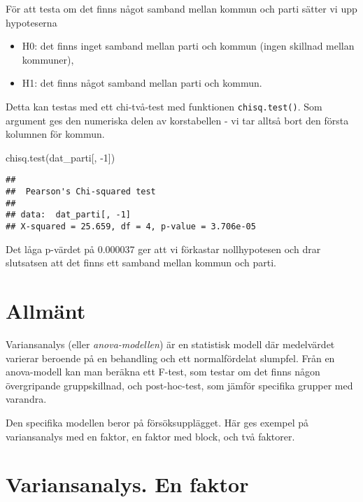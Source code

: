 \documentclass[
]{book}
\newenvironment{Shaded}{\begin{snugshade}}{\end{snugshade}}
\newcommand{\DecValTok}[1]{\textcolor[rgb]{0.00,0.00,0.81}{#1}}
\newcommand{\FunctionTok}[1]{\textcolor[rgb]{0.00,0.00,0.00}{#1}}
\newcommand{\NormalTok}[1]{#1}
\newcommand{\SpecialCharTok}[1]{\textcolor[rgb]{0.00,0.00,0.00}{#1}}
\providecommand{\tightlist}{%
  \setlength{\itemsep}{0pt}\setlength{\parskip}{0pt}}
\theoremstyle{definition}
\theoremstyle{definition}
\theoremstyle{definition}
\theoremstyle{definition}
\theoremstyle{remark}
\begin{document}
För att testa om det finns något samband mellan kommun och parti sätter vi upp hypoteserna

\begin{itemize}
\tightlist
\item
  H0: det finns inget samband mellan parti och kommun (ingen skillnad mellan kommuner),
\item
  H1: det finns något samband mellan parti och kommun.
\end{itemize}

Detta kan testas med ett chi-två-test med funktionen \texttt{chisq.test()}. Som argument ges den numeriska delen av korstabellen - vi tar alltså bort den första kolumnen för kommun.

\begin{Shaded}
\begin{Highlighting}[]
\FunctionTok{chisq.test}\NormalTok{(dat\_parti[, }\SpecialCharTok{{-}}\DecValTok{1}\NormalTok{])}
\end{Highlighting}
\end{Shaded}

\begin{verbatim}
## 
##  Pearson's Chi-squared test
## 
## data:  dat_parti[, -1]
## X-squared = 25.659, df = 4, p-value = 3.706e-05
\end{verbatim}

Det låga p-värdet på 0.000037 ger att vi förkastar nollhypotesen och drar slutsatsen att det finns ett samband mellan kommun och parti.

\hypertarget{allmuxe4nt}{%
\section{Allmänt}\label{allmuxe4nt}}

Variansanalys (eller \emph{anova-modellen}) är en statistisk modell där medelvärdet varierar beroende på en behandling och ett normalfördelat slumpfel. Från en anova-modell kan man beräkna ett F-test, som testar om det finns någon övergripande gruppskillnad, och post-hoc-test, som jämför specifika grupper med varandra.

Den specifika modellen beror på försöksupplägget. Här ges exempel på variansanalys med en faktor, en faktor med block, och två faktorer.

\hypertarget{variansanalys.-en-faktor}{%
\section{Variansanalys. En faktor}\label{variansanalys.-en-faktor}}
\end{document}
